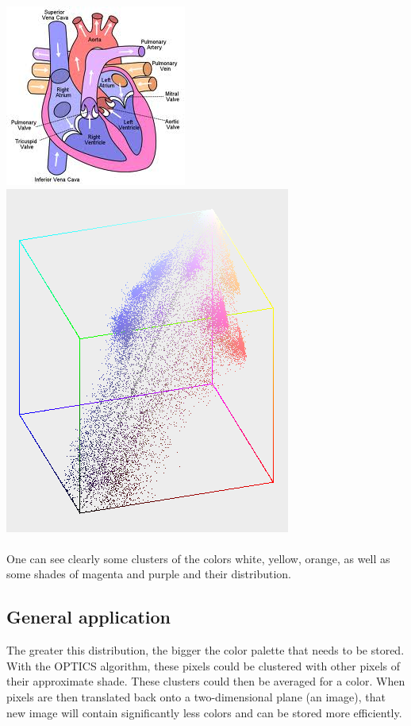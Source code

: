 \documentclass[12pt,a4paper]{article}
\begin{document}
\includegraphics[scale=0.6]{img/diagram.png}
\includegraphics[scale=0.6]{img/colorplot.png}
\\
\\
One can see clearly some clusters of the colors white, yellow, orange, as well as some shades of magenta and purple and their distribution.

\subsection{General application}
The greater this distribution, the bigger the color palette that needs to be stored. With the OPTICS algorithm, these pixels could be clustered with other pixels of their approximate shade. These clusters could then be averaged for a color. When pixels are then translated back onto a two-dimensional plane (an image), that new image will contain significantly less colors and can be stored more efficiently.
\end{document}
